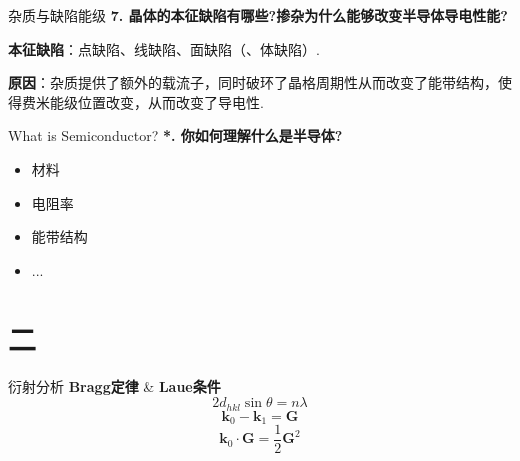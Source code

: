 \documentclass{beamer}
\begin{document}
\begin{frame}[t]{杂质与缺陷能级}
    \textbf{7. 晶体的本征缺陷有哪些?掺杂为什么能够改变半导体导电性能?}\par
    \vspace{0.1cm}
    \textbf{本征缺陷}：点缺陷、线缺陷、面缺陷（、体缺陷）.\par
    \vspace{0.1cm}
    \textbf{原因}：杂质提供了额外的载流子，同时破环了晶格周期性从而改变了能带结构，使得费米能级位置改变，从而改变了导电性.
    
\end{frame}

\begin{frame}[t]{What is Semiconductor?}
    \textbf{*. 你如何理解什么是半导体?}\par
    \vspace{0.2cm}
    \begin{itemize}
        \item 材料
        \item 电阻率
        \item 能带结构
        \item ...
    \end{itemize}
\end{frame}


\section{二}
\begin{frame}[t]{衍射分析}
    \textbf{Bragg定律} \& \textbf{Laue条件}
    \vspace{0.2cm}
    \[
    2d_{hkl}\sin \theta = n \lambda  
    \]
    \vspace{-0.3cm}
    \[
    \boldsymbol{k}_0 - \boldsymbol{k}_1 = \boldsymbol{G} 
    \]
    \vspace{-0.2cm}    
    \[
    \boldsymbol{k}_0 \cdot \boldsymbol{G} = \frac{1}{2}\boldsymbol{G}^2
    \]    
\end{frame}
\end{document}
